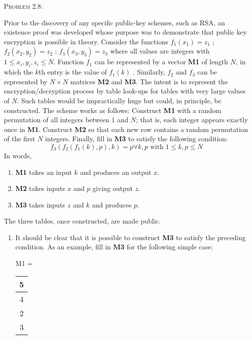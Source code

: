 \documentclass[12pt]{article}
\newenvironment{problem}[1]
{\begin{mdframed}[linewidth=0.8pt]
        \textsc{Problem #1:}

}
    {\end{mdframed}}
\begin{document}
	\begin{problem}{2.8}
		Prior to the discovery of any specific public-key schemes, such as RSA,
		an existence proof was developed whose purpose was to demonstrate that
		public key encryption is possible in theory. Consider the functions
		$f_1\left( x_1 \right) =z_1$ ; $f_2\left( x_2,y_2 \right) = z_2$ ;
		$f_3\left( x_3,y_3 \right) = z_3$ where all values are integers with
		$1 \le x_i,y_i,z_i \le N$. Function $f_1$ can be represented by a vector
		\textbf{M1} of length $N$, in which the  $k$th entry is the value of $f_1\left( k \right)$
		. Similarly, $f_2$ and $f_3$ can be represented by $N \times N$ matrices
		\textbf{M2} and \textbf{M3}. The intent is to represent the
		encryption/decryption process by table look-ups for tables with very large
		values of $N$. Such tables would be impractically huge but could, in principle,
		be constructed. The scheme works as follows: Construct \textbf{M1} with a random
		permutation of all integers between $1$ and  $N$; that is, each integer appears
		exactly once in \textbf{M1}. Construct \textbf{M2} so that each new row contains
		a random permutation of the first $N$ integers. Finally, fill in \textbf{M3} to
		satisfy the following condition:
		\begin{equation*}
			f_3\left( f_2\left( f_1\left( k \right) ,p \right) ,k \right) = p \forall k,p
			\text{ with } 1\le k,p\le N
		\end{equation*}
		In words,
		\begin{enumerate}
			\item \textbf{M1} takes an input $k$ and produces an output $x$.
			\item \textbf{M2} takes inputs $x$ and $p$ giving output $z$.
			\item \textbf{M3} takes inputs $z$ and $k$ and produces $p$.
		\end{enumerate}
		The three tables, once constructed, are made public.
		\begin{enumerate}[label=\alph*]
			\item It should be clear that it is possible to construct \textbf{M3}
				to satisfy the preceding condition. As an example, fill
				in \textbf{M3} for the following simple case:
				\begin{center}
				M1 =\ \
				\begin{tabular}{|c|}
					\hline
					5 \\ \hline
					4 \\ \hline
					2 \\ \hline
					3 \\ \hline

\end{tabular}
\end{center}
\end{enumerate}
\end{problem}
\end{document}
